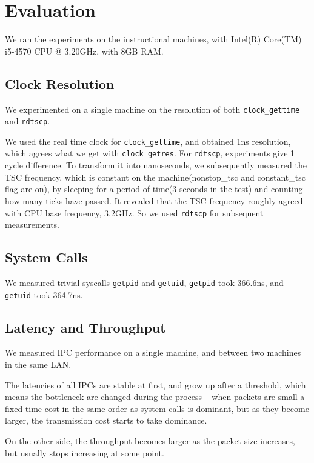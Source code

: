 \section{Evaluation}

We ran the experiments on the instructional machines, with Intel(R) Core(TM) i5-4570 CPU @ 3.20GHz, with 8GB RAM.

\subsection{Clock Resolution}

We experimented on a single machine on the resolution of both \texttt{clock\_gettime} and \texttt{rdtscp}.

We used the real time clock for \texttt{clock\_gettime}, and obtained 1ns resolution, which agrees what we get with \texttt{clock\_getres}. For \texttt{rdtscp}, experiments give 1 cycle difference. To transform it into nanoseconds, we subsequently measured the TSC frequency, which is constant on the machine(nonstop\_tsc and constant\_tsc flag are on), by sleeping for a period of time(3 seconds in the test) and counting how many ticks have passed. It revealed that the TSC frequency roughly agreed with CPU base frequency, 3.2GHz. So we used \texttt{rdtscp} for subsequent measurements.

\subsection{System Calls}

We measured trivial syscalls \texttt{getpid} and \texttt{getuid}, \texttt{getpid} took 366.6ns, and \texttt{getuid} took 364.7ns.

\subsection{Latency and Throughput}

We measured IPC performance on a single machine, and between two machines in the same LAN.

The latencies of all IPCs are stable at first, and grow up after a threshold, which means the bottleneck are changed during the process -- when packets are small a fixed time cost in the same order as system calls is dominant, but as they become larger, the transmission cost starts to take dominance.

On the other side, the throughput becomes larger as the packet size increases, but usually stops increasing at some point.

